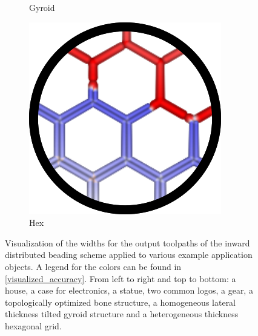 \begin{figure}
\begin{subfigure}{\figwidth}
\caption{Gyroid}\label{applications_gyroid}
\end{subfigure}
\begin{subfigure}{\figwidth}\centering
\includegraphics[height=\figheight]{sources-applications-hex-grid.png}
\caption{Hex}\label{applications_hex}
\end{subfigure}
\caption{
Visualization of the widths for the output toolpaths of the inward distributed beading scheme applied to various example application objects.
A legend for the colors can be found in \cref{visualized_accuracy}.
From left to right and top to bottom: a house, a case for electronics, a statue, two common logos, a gear, a topologically optimized bone structure, a homogeneous lateral thickness tilted gyroid structure and a heterogeneous thickness hexagonal grid.
}
\label{applications_overview}
\end{figure}




